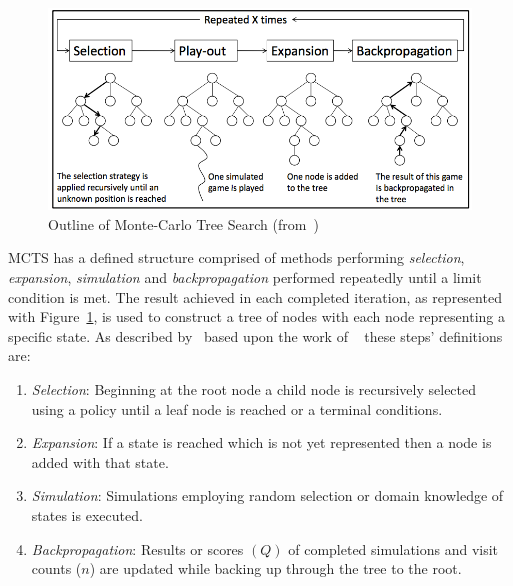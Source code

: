 \documentclass[letterpaper]{article}
\begin{document}
\begin{figure}[!t]
\begin{center}
\includegraphics[width=\textwidth]{images/outlinemcts.png}
\end{center}
\caption{Outline of Monte-Carlo Tree Search (from~\cite{winands2010monte}) }
\label{fig:OUTMCTS}
\end{figure}

MCTS has a defined structure comprised of methods performing \emph{selection}, \emph{expansion}, \emph{simulation} and \emph{backpropagation} performed repeatedly until a limit condition is met. The result achieved in each completed iteration, as represented with Figure~\ref{fig:OUTMCTS}, is used to construct a tree of nodes with each node representing a specific state. As described by~\cite{browne2012survey} based upon the work of ~\cite{chaslot2008monte} these steps' definitions are:

%

\begin{enumerate}
\item \emph{Selection}: Beginning at the root node a child node is recursively selected using a policy until a leaf node is reached or a terminal conditions.
\item \emph{Expansion}: If a state is reached which is not yet represented then a node is added with that state.
\item \emph{Simulation}: Simulations employing random selection or domain knowledge of states is executed.
\item \emph{Backpropagation}: Results or scores $(Q)$ of completed simulations and visit counts ($n$) are updated while backing up through the tree to the root.
\end{enumerate}
\end{document}
